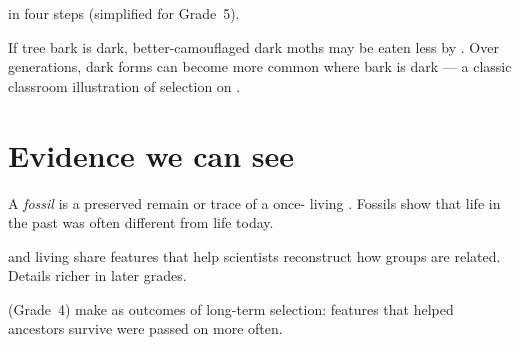 \begin{omfigure}

{\small {} in four steps (simplified for Grade~5).}
\end{omfigure}

\begin{example}\label{ex:g5:evolution:moth}
If tree bark is dark, better-camouflaged dark moths may be eaten less by
. Over generations, dark forms can become more common where bark is
dark --- a classic classroom illustration of selection on .
\end{example}

\section{Evidence we can see}

\begin{definition}[Fossil]\label{def:g5:evolution:fossil}
A \emph{fossil} is a preserved remain or trace of a once-
living . Fossils show that life in the past was often different
from life today.
\end{definition}

\begin{example}\label{ex:g5:evolution:dino}
  and living  share features that help scientists
reconstruct how groups are related. Details  richer in later grades.
\end{example}

\begin{proposition}\label{prop:g5:evolution:adapt}
 (Grade~4) make  as outcomes of long-term selection:
features that helped ancestors survive were passed on more often.
\end{proposition}
\admitted

